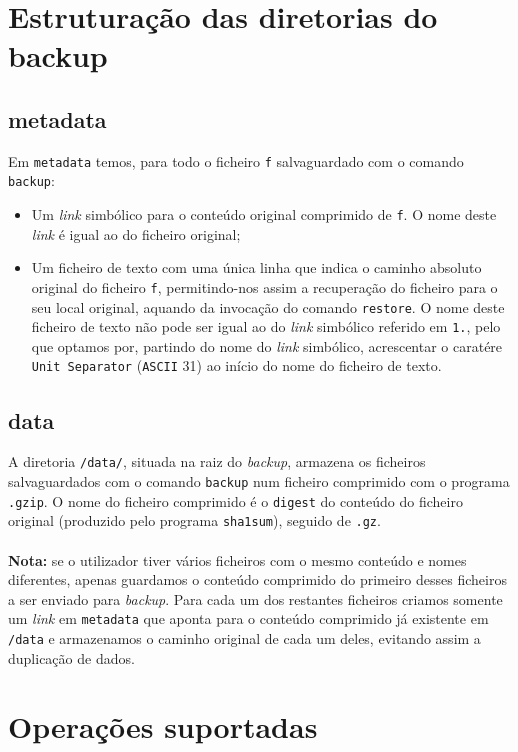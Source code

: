 \documentclass[a4paper,12pt,titlepage,draft,portuguese]{article}
\begin{document}
\section{Estruturação das diretorias do backup}

\subsection{metadata}
Em \texttt{metadata} temos, para todo o ficheiro \texttt{f} salvaguardado com o comando \texttt{backup}:
	\begin{itemize}
		\item Um \emph{link} simbólico para o conteúdo original comprimido de \texttt{f}. O nome deste \emph{link} é igual ao do ficheiro original;
		\item Um ficheiro de texto com uma única linha que indica o caminho absoluto original do ficheiro \texttt{f}, permitindo-nos assim a recuperação do ficheiro para o seu local original, aquando da invocação do comando \texttt{restore}. O nome deste ficheiro de texto não pode ser igual ao do \emph{link} simbólico referido em \texttt{1.}, pelo que optamos por, partindo do nome do \emph{link} simbólico, acrescentar o caratére \texttt{Unit Separator} (\texttt{ASCII} 31) ao início do nome do ficheiro de texto.
	\end{itemize}

\subsection{data}
A diretoria \texttt{/data/}, situada na raiz do \emph{backup}, armazena os ficheiros salvaguardados com o comando \texttt{backup} num ficheiro comprimido com o programa \texttt{.gzip}. O nome do ficheiro comprimido é o \texttt{digest} do conteúdo do ficheiro original (produzido pelo programa \texttt{sha1sum}), seguido de \texttt{.gz}.\\\\\textbf{Nota:} se o utilizador tiver vários ficheiros com o mesmo conteúdo e nomes diferentes, apenas guardamos o conteúdo comprimido do primeiro desses ficheiros a ser enviado para \emph{backup}. Para cada um dos restantes ficheiros criamos somente um \emph{link} em \texttt{metadata} que aponta para o conteúdo comprimido já existente em \texttt{/data} e armazenamos o caminho original de cada um deles, evitando assim a duplicação de dados.

\section{Operações suportadas}
\end{document}

